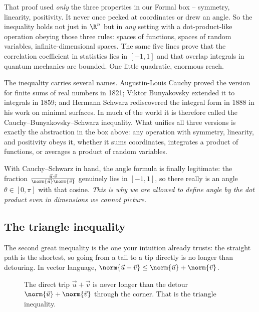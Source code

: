 \begin{aestheticbox}
That proof used \emph{only} the three properties in our Formal box -- symmetry,
linearity, positivity. It never once peeked at coordinates or drew an angle. So the
inequality holds not just in $\R^n$ but in \emph{any} setting with a
dot-product-like operation obeying those three rules: spaces of functions, spaces of
random variables, infinite-dimensional spaces. The same five lines prove that the
correlation coefficient in statistics lies in $[-1,1]$ and that overlap integrals in
quantum mechanics are bounded. One little quadratic, enormous reach.
\end{aestheticbox}

\begin{historybox}
The inequality carries several names. Augustin-Louis Cauchy proved the version for
finite sums of real numbers in 1821; Viktor Bunyakovsky extended it to integrals in
1859; and Hermann Schwarz rediscovered the integral form in 1888 in his work on
minimal surfaces. In much of the world it is therefore called the
Cauchy--Bunyakovsky--Schwarz inequality. What unifies all three versions is exactly
the abstraction in the box above: any operation with symmetry, linearity, and
positivity obeys it, whether it sums coordinates, integrates a product of functions,
or averages a product of random variables.
\end{historybox}

With Cauchy--Schwarz in hand, the angle formula is finally legitimate: the fraction
$\frac{\vec u\cdot\vec v}{\norm{\vec u}\norm{\vec v}}$ genuinely lies in $[-1,1]$, so
there really is an angle $\theta\in[0,\pi]$ with that cosine. \emph{This is why we
are allowed to define angle by the dot product even in dimensions we cannot picture.}

\subsection{The triangle inequality}

The second great inequality is the one your intuition already trusts: the straight
path is the shortest, so going from a tail to a tip directly is no longer than
detouring. In vector language,
$\norm{\vec u + \vec v} \le \norm{\vec u} + \norm{\vec v}$.

\begin{figure}[H]
\centering
{}
\caption{The direct trip $\vec u+\vec v$ is never longer than the detour
$\norm{\vec u}+\norm{\vec v}$ through the corner. That is the triangle inequality.}
\label{ch04:triangle}
\end{figure}

